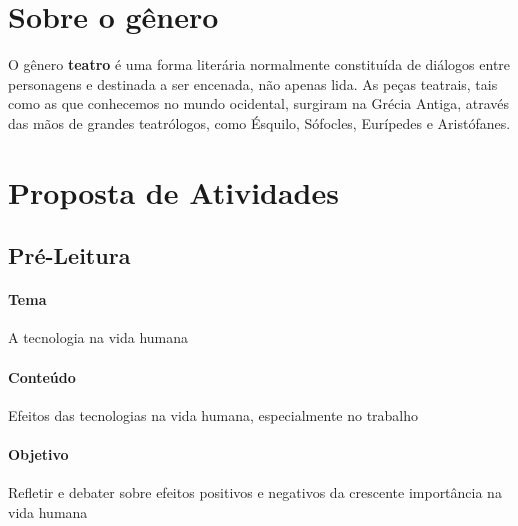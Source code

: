 \documentclass[11pt]{extarticle}
\begin{document}
\section{Sobre o gênero}

O gênero \textbf{teatro} é uma forma literária normalmente constituída de diálogos entre personagens e destinada a ser encenada, não apenas lida. As peças teatrais, tais como as que conhecemos no mundo ocidental, surgiram na Grécia Antiga, através das mãos de grandes teatrólogos, como Ésquilo, Sófocles, Eurípedes e Aristófanes.

\section{Proposta de Atividades}
\subsection{Pré-Leitura}


\paragraph{Tema} A tecnologia na vida humana

\paragraph{Conteúdo} Efeitos das tecnologias na vida humana, especialmente no trabalho 

\paragraph{Objetivo} Refletir e debater sobre efeitos positivos e negativos da crescente importância na vida humana 
\end{document}
